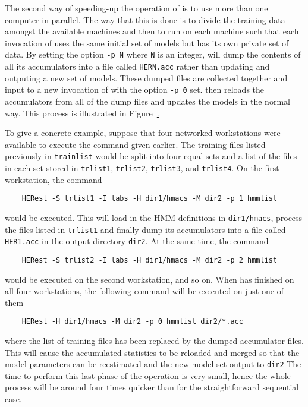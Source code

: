 
The second way of speeding-up the operation of  is to use more than
one computer in parallel.  The way that this is done is to divide the
training data amongst the available machines and then to run  on each
machine such that each invocation of  
uses the same initial set of models but has its own private set of data.
By setting the option {\tt -p N} where {\tt N} is an integer,  will
dump the contents of all its accumulators  into a file called {\tt HERN.acc}
rather than updating and outputing a new set of models.  These dumped
files are collected together and input to a new invocation of  with
the option {\tt -p 0} set.   then reloads the accumulators from
all of the dump files and updates the models in the normal way.
This process is illustrated in Figure~\href{f:parher}.

To give a concrete example, suppose that four networked workstations
were available to execute the  command given earlier. The training files 
listed previously in \texttt{trainlist} would be split 
into four equal sets and a list
of the files in each set stored in {\tt trlist1}, 
{\tt trlist2}, {\tt trlist3}, and {\tt trlist4}.
On the first workstation, the command
\begin{verbatim}
    HERest -S trlist1 -I labs -H dir1/hmacs -M dir2 -p 1 hmmlist
\end{verbatim}
would be executed.  This will load in the HMM definitions in 
{\tt dir1/hmacs}, process the files listed in {\tt trlist1} and finally
dump its accumulators into a file called {\tt HER1.acc} in the output
directory {\tt dir2}.  At the same time, the command
\begin{verbatim}
    HERest -S trlist2 -I labs -H dir1/hmacs -M dir2 -p 2 hmmlist
\end{verbatim}
would be executed on the second workstation, and so on.  When 
 has finished on all four
workstations,  the following command will be executed on just one of them
\begin{verbatim}
    HERest -H dir1/hmacs -M dir2 -p 0 hmmlist dir2/*.acc
\end{verbatim}
where the list of training files has been replaced by the dumped accumulator
files.  This will cause the accumulated
statistics to be reloaded and merged so that the model parameters can
be reestimated and the new model set output to \texttt{dir2}
The time to perform this last phase of the operation is very small, hence
the whole process will be around four times quicker than for the
straightforward sequential case. 

